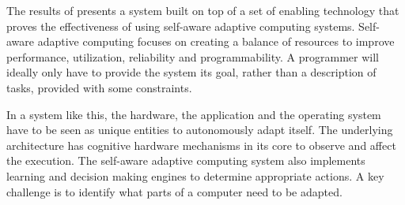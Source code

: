  
The results of \cite{selfaware} presents a system built on top of a set of enabling technology that proves the effectiveness of using self-aware adaptive computing systems.
Self-aware adaptive computing focuses on creating a balance of resources to improve performance, utilization, reliability and programmability. 
A programmer will ideally only have to provide the system its goal, rather than a description of tasks, provided with some constraints.

In a system like this, the hardware, the application and the operating system have to be seen as unique entities to autonomously adapt itself. 
The underlying architecture has cognitive hardware mechanisms in its core to observe and affect the execution. 
The self-aware adaptive computing system also implements learning and decision making engines  to determine appropriate actions. 
A key challenge is to identify what parts of a computer need to be adapted.
